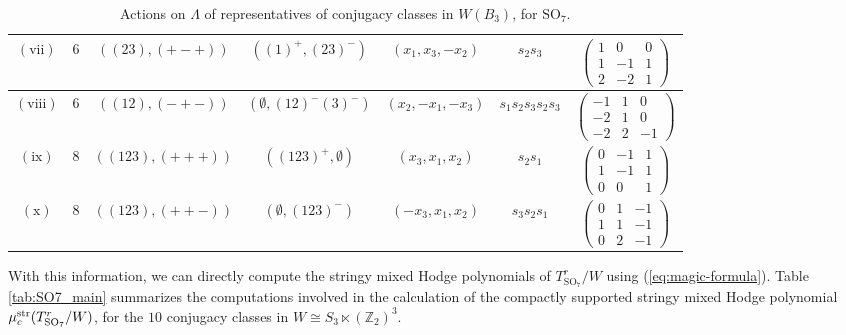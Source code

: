 \documentclass[11pt,english]{amsart}
\numberwithin{equation}{section}
\numberwithin{figure}{section}
\theoremstyle{plain}
\theoremstyle{plain}
\theoremstyle{definition}
\theoremstyle{remark}
\newcommand{\SO}{\operatorname{SO}}
\newcommand{\str}{\textup{str}}
\begin{document}
\begin{table}[H]
\begin{tabular}{|c|c|c|c|c|c|c|}
        $(\text{vii})$ & $6$ & $((23), (+-+))$ & $((1)^+, (23)^-)$ & $(x_1, x_3, -x_2)$ & $s_2 s_3$ & $\begin{pmatrix} 1 & 0 & 0 \\ 1 & -1 & 1 \\ 2 & -2 & 1 \end{pmatrix}$ \\\hline
        $(\text{viii})$ & $6$ & $((12), (-+-))$ & $(\emptyset, (12)^-(3)^-)$ & $(x_2, -x_1, -x_3)$ & $s_1 s_2 s_3 s_2 s_3$ & $\begin{pmatrix} -1 & 1 & 0 \\ -2 & 1 & 0 \\ -2 & 2 & -1 \end{pmatrix}$ \\\hline
        $(\text{ix})$ & $8$ & $((123), (+++))$ & $((123)^+, \emptyset)$ & $(x_3, x_1, x_2)$ & $s_2 s_1$ & $\begin{pmatrix} 0 & -1 & 1 \\ 1 & -1 & 1 \\ 0 & 0 & 1 \end{pmatrix}$ \\\hline
        $(\text{x})$ & $8$ & $((123), (++-))$ & $(\emptyset, (123)^-)$ & $(-x_3, x_1, x_2)$ & $s_3 s_2 s_1$ & $\begin{pmatrix} 0 & 1 & -1 \\ 1 & 1 & -1 \\ 0 & 2 & -1 \end{pmatrix}$ \\\hline
    \end{tabular}
    \caption{Actions on $\Lambda$ of representatives of conjugacy classes in $W(B_3)$, for $\mathrm{SO}_7$.}
    \label{tab:SO7_action}
\end{table}
\vspace{-0.5cm}
With this information, we can directly compute the stringy mixed Hodge polynomials of $T_{\SO_7}^r/W$ using (\ref{eq:magic-formula}). Table \ref{tab:SO7_main} summarizes the computations involved in the calculation of the compactly supported stringy mixed Hodge polynomial $\mu^{\str}_c(T_{\SO_7}^r/W)$, for the $10$ conjugacy classes in $W \cong S_3 \ltimes (\mathbb{Z}_2)^3$.
\vspace{-0.5cm}
\end{document}
